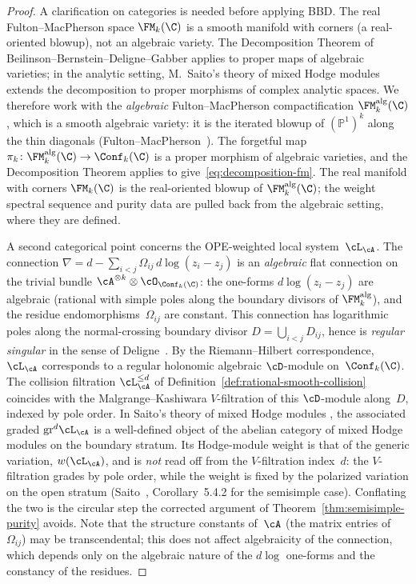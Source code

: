 \begin{proof}
A clarification on categories is needed before applying BBD.
The real Fulton--MacPherson space $\FM_k(\C)$ is a smooth manifold
with corners (a real-oriented blowup), not an algebraic variety.
The Decomposition Theorem of Beilinson--Bernstein--Deligne--Gabber
\cite{BBD82} applies to proper maps of algebraic varieties; in
the analytic setting, M.~Saito's theory of mixed Hodge modules
\cite{Saito90} extends the decomposition to proper morphisms of
complex analytic spaces. We therefore work with the \emph{algebraic}
Fulton--MacPherson compactification $\FM_k^{\mathrm{alg}}(\C)$,
which is a smooth algebraic variety: it is the iterated blowup of
$(\mathbb{P}^1)^k$ along the thin diagonals
(Fulton--MacPherson~\cite{FM94}). The forgetful map
$\pi_k\colon \FM_k^{\mathrm{alg}}(\C) \to \Conf_k(\C)$ is a proper
morphism of algebraic varieties, and the Decomposition Theorem
applies to give~\eqref{eq:decomposition-fm}. The real manifold with
corners $\FM_k(\C)$ is the real-oriented blowup of
$\FM_k^{\mathrm{alg}}(\C)$; the weight spectral sequence and purity
data are pulled back from the algebraic setting, where they are
defined.

A second categorical point concerns the OPE-weighted local
system~$\cL_\cA$. The connection
$\nabla = d - \sum_{i<j}\Omega_{ij}\,d\log(z_i - z_j)$
is an \emph{algebraic} flat connection on the trivial bundle
$\cA^{\otimes k} \otimes \cO_{\Conf_k(\C)}$: the one-forms
$d\log(z_i - z_j)$ are algebraic (rational with simple poles along
the boundary divisors of $\FM_k^{\mathrm{alg}}$), and the residue
endomorphisms~$\Omega_{ij}$ are constant. This connection has
logarithmic poles along the normal-crossing boundary divisor
$D = \bigcup_{i<j}D_{ij}$, hence is \emph{regular singular} in
the sense of Deligne~\cite{Deligne70}. By the Riemann--Hilbert
correspondence, $\cL_\cA$ corresponds to a regular holonomic
algebraic $\cD$-module on~$\Conf_k(\C)$. The collision filtration
$\cL^{\leq d}_\cA$ of Definition~\ref{def:rational-smooth-collision}
coincides with the Malgrange--Kashiwara $V$-filtration
of this $\cD$-module along~$D$, indexed by pole order. In Saito's
theory of mixed Hodge modules \cite{Saito90}, the associated graded
$\mathrm{gr}^d\cL_\cA$ is a well-defined object of the
abelian category of mixed Hodge modules on the boundary stratum.
Its Hodge-module weight is that of the generic variation,
$w(\cL_\cA)$, and is \emph{not} read off from the
$V$-filtration index~$d$: the $V$-filtration grades by pole order,
while the weight is fixed by the polarized variation on the open
stratum (Saito~\cite{Saito90}, Corollary~5.4.2 for the semisimple
case). Conflating the two is the circular step the corrected
argument of Theorem~\ref{thm:semisimple-purity} avoids.
Note that the structure constants of~$\cA$ (the matrix entries
of~$\Omega_{ij}$) may be transcendental; this does not affect
algebraicity of the connection, which depends only on
the algebraic nature of the $d\log$ one-forms and the constancy
of the residues.


\end{proof}
